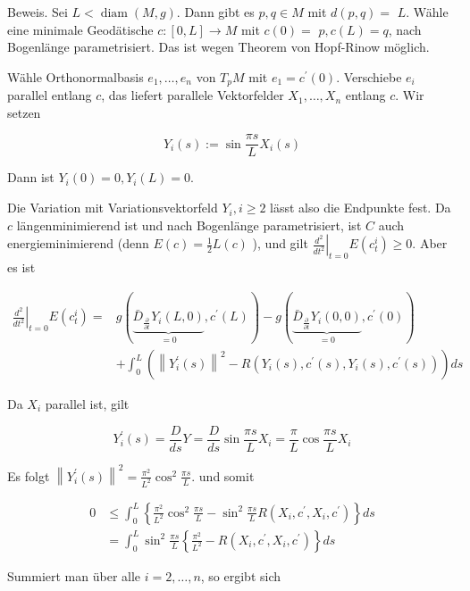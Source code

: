 \documentclass[10pt, letterpaper]{article}
\begin{document}
Beweis. Sei $L<\operatorname{diam}(M, g)$. Dann gibt es $p, q \in M$ mit $d(p, q)=$ $L$. Wähle eine minimale Geodätische $c:[0, L] \rightarrow M$ mit $c(0)=$ $p, c(L)=q$, nach Bogenlänge parametrisiert. Das ist wegen Theorem von Hopf-Rinow möglich.

Wähle Orthonormalbasis $e_{1}, \ldots, e_{n}$ von $T_{p} M$ mit $e_{1}=c^{\prime}(0)$. Verschiebe $e_{i}$ parallel entlang $c$, das liefert parallele Vektorfelder $X_{1}, \ldots, X_{n}$ entlang $c$. Wir setzen

$$
Y_{i}(s):=\sin \frac{\pi s}{L} X_{i}(s)
$$

Dann ist $Y_{i}(0)=0, Y_{i}(L)=0$.

Die Variation mit Variationsvektorfeld $Y_{i}, i \geq 2$ lässt also die Endpunkte fest. Da $c$ längenminimierend ist und nach Bogenlänge parametrisiert, ist $C$ auch energieminimierend (denn $E(c)=\frac{1}{2} L(c)$ ), und gilt $\left.\frac{d^{2}}{d t^{2}}\right|_{t=0} E\left(c_{t}^{i}\right) \geq 0$. Aber es ist

$$
\begin{aligned}
\left.\frac{d^{2}}{d t^{2}}\right|_{t=0} E\left(c_{t}^{i}\right)= & g(\underbrace{\bar{D}_{\frac{\partial}{\partial t}} Y_{i}(L, 0)}_{=0}, c^{\prime}(L))-g(\underbrace{\bar{D}_{\frac{\partial}{\partial t}} Y_{i}(0,0)}_{=0}, c^{\prime}(0)) \\
& +\int_{0}^{L}\left(\left\|Y_{i}^{\prime}(s)\right\|^{2}-R\left(Y_{i}(s), c^{\prime}(s), Y_{i}(s), c^{\prime}(s)\right)\right) d s
\end{aligned}
$$

Da $X_{i}$ parallel ist, gilt

$$
Y_{i}^{\prime}(s)=\frac{D}{d s} Y=\frac{D}{d s} \sin \frac{\pi s}{L} X_{i}=\frac{\pi}{L} \cos \frac{\pi s}{L} X_{i}
$$

Es folgt $\left\|Y_{i}^{\prime}(s)\right\|^{2}=\frac{\pi^{2}}{L^{2}} \cos ^{2} \frac{\pi s}{L}$. und somit

$$
\begin{aligned}
0 & \leq \int_{0}^{L}\left\{\frac{\pi^{2}}{L^{2}} \cos ^{2} \frac{\pi s}{L}-\sin ^{2} \frac{\pi s}{L} R\left(X_{i}, c^{\prime}, X_{i}, c^{\prime}\right)\right\} d s \\
& =\int_{0}^{L} \sin ^{2} \frac{\pi s}{L}\left\{\frac{\pi^{2}}{L^{2}}-R\left(X_{i}, c^{\prime}, X_{i}, c^{\prime}\right)\right\} d s
\end{aligned}
$$

Summiert man über alle $i=2, \ldots, n$, so ergibt sich
\end{document}
